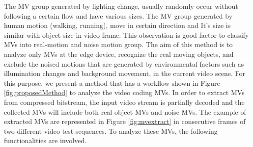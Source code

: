 The MV group generated by lighting change, usually randomly occur without following a certain flow and have various sizes. The MV group generated by human motion (walking, running),  move in certain direction and It’s size is similar with object size in video frame. This observation is good factor to classify MVs into real-motion and noise motion group. The aim of this method is to analyze only MVs at the edge device, recognize the real moving objects, and exclude the noised motions that are generated by environmental factors such as illumination changes and background movement, in the current video scene. For this purpose, we present a method that has a workflow shown in Figure \ref{fig:proposedMethod} to analyze the video coding MVs. In order to extract MVs from compressed bitstream, the input video stream is partially decoded and the collected MVs will include both real object MVs and noise MVs. The example of extracted MVs are represented in Figure \ref{fig:mvextract} in consecutive frames of two different video test sequences. To analyze these MVs, the following functionalities are involved.
